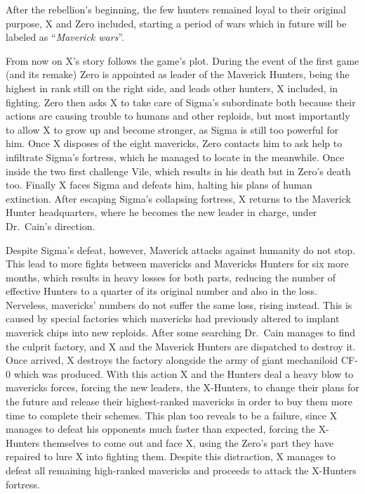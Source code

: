 After the rebellion's beginning, the few hunters remained loyal to their original purpose, X and Zero included, starting a period of wars which in future will be labeled as ``\emph{Maverick wars}''. 

From now on X's story follows the game's plot. During the event of the first game (and its remake) Zero is appointed as leader of the Maverick Hunters, being the highest in rank still on the right side, and leads other hunters, X included, in fighting. Zero then asks  X to take care of Sigma's subordinate both because their actions are causing trouble to humans and other reploids, but most importantly to allow X to grow up and become stronger, as Sigma is still too powerful for him. Once X disposes of the eight mavericks, Zero contacts him to ask help to infiltrate Sigma's fortress, which he managed to locate in the meanwhile. Once inside the two first challenge Vile, which results in his death but in Zero's death too. Finally X faces Sigma and defeats him, halting his plans of human extinction. After escaping Sigma's collapsing fortress, X returns to the Maverick Hunter headquarters, where he becomes the new leader in charge, under Dr.~Cain's direction.

Despite Sigma's defeat, however, Maverick attacks against humanity do not stop. This lead to more fights between mavericks and Mavericks Hunters for six more months, which results in heavy losses for both parts, reducing the number of effective Hunters to a quarter of its original number and also in the loss. Nerveless, mavericks' numbers do not suffer the same loss, rising instead. This is caused by special factories which mavericks had previously altered to implant maverick chips into new reploids. After some searching Dr.~Cain manages to find the culprit factory, and X and the Maverick Hunters are dispatched to destroy it. Once arrived, X destroys the factory alongside the army of giant mechaniloid CF-0 which was produced. With this action X and the Hunters deal a heavy blow to mavericks forces, forcing the new leaders, the X-Hunters, to change their plans for the future and release their highest-ranked mavericks in order to buy them more time to complete their schemes. This plan too reveals to be a failure, since X manages to defeat his opponents much faster than expected, forcing the X-Hunters themselves to come out and face X, using the Zero's part they have repaired to lure X into fighting them. Despite this distraction, X manages to defeat all remaining high-ranked mavericks and proceeds to attack the X-Hunters fortress. 

